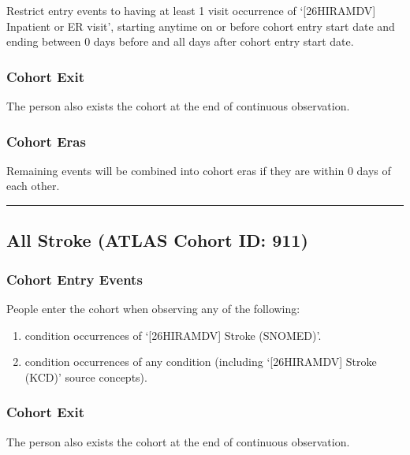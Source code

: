 \documentclass[
  12pt,
]{article}
\begin{document}
Restrict entry events to having at least 1 visit occurrence of
`{[}26HIRAMDV{]} Inpatient or ER visit', starting anytime on or before
cohort entry start date and ending between 0 days before and all days
after cohort entry start date.

\subsubsection{Cohort Exit}\label{cohort-exit-10}

The person also exists the cohort at the end of continuous observation.

\subsubsection{Cohort Eras}\label{cohort-eras-10}

Remaining events will be combined into cohort eras if they are within 0
days of each other.

\begin{center}\rule{0.5\linewidth}{0.5pt}\end{center}

\subsection{All Stroke (ATLAS Cohort ID:
911)}\label{all-stroke-atlas-cohort-id-911}

\subsubsection{Cohort Entry Events}\label{cohort-entry-events-11}

People enter the cohort when observing any of the following:

\begin{enumerate}
\def\labelenumi{\arabic{enumi}.}
\item
  condition occurrences of `{[}26HIRAMDV{]} Stroke (SNOMED)'.
\item
  condition occurrences of any condition (including `{[}26HIRAMDV{]}
  Stroke (KCD)' source concepts).
\end{enumerate}

\subsubsection{Cohort Exit}\label{cohort-exit-11}

The person also exists the cohort at the end of continuous observation.
\end{document}
